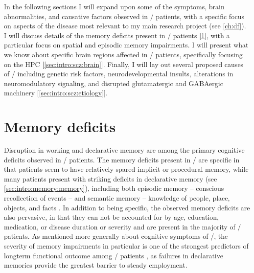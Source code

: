 In the following sections I will expand upon some of the symptoms, brain abnormalities, and causative factors observed in \scz/ patients, with a specific focus on aspects of the disease most relevant to my main research project (see \autoref{ch:df}).
I will discuss details of the memory deficits present in \scz/ patients [\ref{sec:intro:scz:memory}], with a particular focus on spatial and episodic memory impairments.
I will present what we know about specific brain regions affected in \scz/ patients, specifically focusing on the \ac{HPC} [\ref{sec:intro:scz:brain}].
Finally, I will lay out several proposed causes of \scz/ including genetic risk factors, neurodevelopmental insults, alterations in neuromodulatory signaling, and disrupted glutamatergic and GABAergic machinery [\ref{sec:intro:scz:etiology}].

\section{Memory deficits}
\label{sec:intro:scz:memory}
Disruption in working and declarative memory are among the primary cognitive deficits observed in \scz/ patients.
The memory deficits present in \scz/ are specific in that patients seem to have relatively spared implicit or procedural memory, while many patients present with striking deficits in declarative memory (see \autoref{sec:intro:memory:memory}), including both episodic memory -- conscious recollection of events -- and semantic memory -- knowledge of people, place, objects, and facts \citep{O'Carroll2000, Aleman1999, Gold2010}.
In addition to being specific, the observed memory deficits are also pervasive, in that they can not be accounted for by age, education, medication, or disease duration or severity \citep{Ranganath2008} and are present in the majority of \scz/ patients.
As mentioned more generally about cognitive symptoms of \scz/, the severity of memory impairments in particular is one of the strongest predictors of longterm functional outcome among \scz/ patients \citep{Green1996}, as failures in declarative memories provide the greatest barrier to steady employment.

